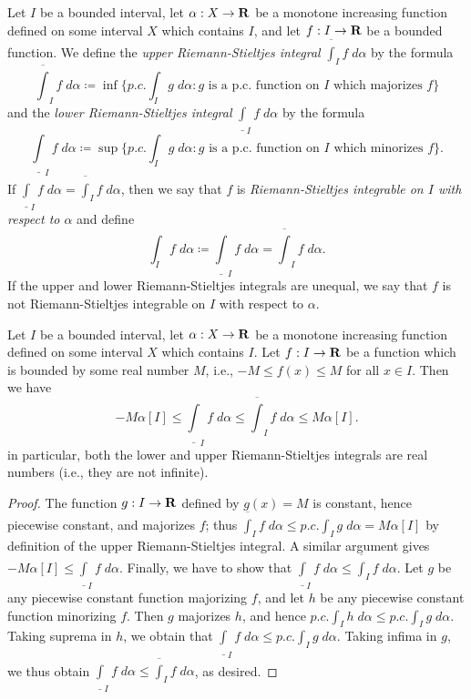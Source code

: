 \begin{additional corollary}\label{ac 11.8.8}
Let \(I\) be a bounded interval, let \(\alpha : X \to \mathbf{R}\) be a monotone increasing function defined on some interval \(X\) which contains \(I\), and let \(f : I \to \mathbf{R}\) be a bounded function.
We define the \emph{upper Riemann-Stieltjes integral} \(\overline{\int}_I f \; d \alpha\) by the formula
\[
    \overline{\int}_I f \; d \alpha \coloneqq \inf\bigg\{p.c. \int_I g \; d \alpha : g \text{ is a p.c. function on \(I\) which majorizes } f\bigg\}
\]
and the \emph{lower Riemann-Stieltjes integral} \(\underline{\int}_I f \; d \alpha\) by the formula
\[
    \underline{\int}_I f \; d \alpha \coloneqq \sup\bigg\{p.c. \int_I g \; d \alpha : g \text{ is a p.c. function on \(I\) which minorizes } f\bigg\}.
\]
If \(\underline{\int}_I f \; d \alpha = \overline{\int}_I f \; d \alpha\), then we say that \(f\) is \emph{Riemann-Stieltjes integrable on \(I\) with respect to \(\alpha\)} and define
\[
    \int_I f \; d \alpha \coloneqq \underline{\int}_I f \; d \alpha = \overline{\int}_I f \; d \alpha.
\]
If the upper and lower Riemann-Stieltjes integrals are unequal, we say that \(f\) is not Riemann-Stieltjes integrable on \(I\) with respect to \(\alpha\).
\end{additional corollary}

\begin{additional corollary}\label{ac 11.8.9}
Let \(I\) be a bounded interval, let \(\alpha : X \to \mathbf{R}\) be a monotone increasing function defined on some interval \(X\) which contains \(I\).
Let \(f : I \to \mathbf{R}\) be a function which is bounded by some real number \(M\), i.e., \(-M \leq f(x) \leq M\) for all \(x \in I\).
Then we have
\[
    -M \alpha[I] \leq \underline{\int}_I f \; d \alpha \leq \overline{\int}_I f \; d \alpha \leq M \alpha[I].
\]
in particular, both the lower and upper Riemann-Stieltjes integrals are real numbers (i.e., they are not infinite).
\end{additional corollary}

\begin{proof}
    The function \(g : I \to \mathbf{R}\) defined by \(g(x) = M\) is constant, hence piecewise constant, and majorizes \(f\);
    thus \(\overline{\int}_I f \; d \alpha \leq p.c. \int_I g \; d \alpha = M \alpha[I]\) by definition of the upper Riemann-Stieltjes integral.
    A similar argument gives \(-M \alpha[I] \leq \underline{\int}_I f \; d \alpha\).
    Finally, we have to show that \(\underline{\int}_I f \; d \alpha \leq \overline{\int}_I f \; d \alpha\).
    Let \(g\) be any piecewise constant function majorizing \(f\), and let \(h\) be any piecewise constant function minorizing \(f\).
    Then \(g\) majorizes \(h\), and hence \(p.c. \int_I h \; d \alpha \leq p.c. \int_I g \; d \alpha\).
    Taking suprema in \(h\), we obtain that \(\underline{\int}_I f \; d \alpha \leq p.c. \int_I g \; d \alpha\).
    Taking infima in \(g\), we thus obtain \(\underline{\int}_I f \; d \alpha \leq \overline{\int}_I f \; d \alpha\), as desired.
\end{proof}

